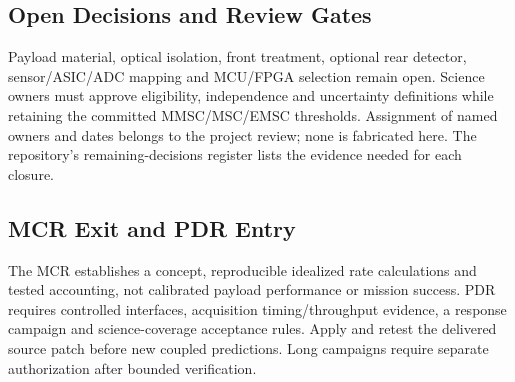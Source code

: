 \subsection{Open Decisions and Review Gates}
Payload material, optical isolation, front treatment, optional rear detector, sensor/ASIC/ADC mapping and MCU/FPGA selection remain open. Science owners must approve eligibility, independence and uncertainty definitions while retaining the committed MMSC/MSC/EMSC thresholds. Assignment of named owners and dates belongs to the project review; none is fabricated here. The repository's remaining-decisions register lists the evidence needed for each closure.

\subsection{MCR Exit and PDR Entry}
The MCR establishes a concept, reproducible idealized rate calculations and tested accounting, not calibrated payload performance or mission success. PDR requires controlled interfaces, acquisition timing/throughput evidence, a response campaign and science-coverage acceptance rules. Apply and retest the delivered source patch before new coupled predictions. Long campaigns require separate authorization after bounded verification.
